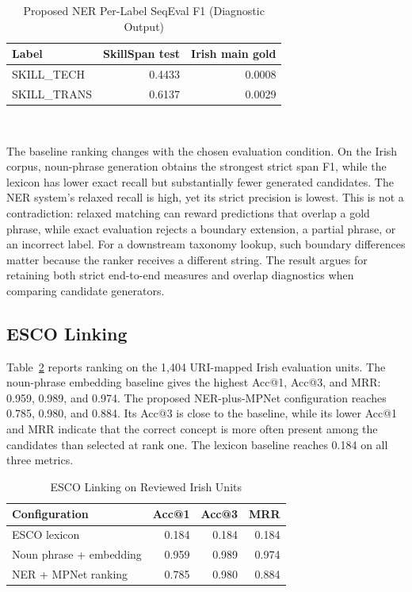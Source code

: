 \documentclass[conference]{IEEEtran}
\begin{document}
\begin{table}[!t]
\caption{Proposed NER Per-Label SeqEval F1 (Diagnostic Output)}
\label{tab:class-f1}
\centering
\small
\begin{tabular}{lrr}
\toprule
Label & SkillSpan test & Irish main gold \\
\midrule
\textsf{SKILL\_TECH} & 0.4433 & 0.0008 \\
\textsf{SKILL\_TRANS} & 0.6137 & 0.0029 \\
\bottomrule
\end{tabular}
\\[1mm]
\par\vspace{1mm}{\footnotesize Source: per-label SeqEval report fields in the final extraction results; these are not class-wise exact-span F1 scores.}
\end{table}

The baseline ranking changes with the chosen evaluation condition. On the Irish corpus, noun-phrase generation obtains the strongest strict span F1, while the lexicon has lower exact recall but substantially fewer generated candidates. The NER system's relaxed recall is high, yet its strict precision is lowest. This is not a contradiction: relaxed matching can reward predictions that overlap a gold phrase, while exact evaluation rejects a boundary extension, a partial phrase, or an incorrect label. For a downstream taxonomy lookup, such boundary differences matter because the ranker receives a different string. The result argues for retaining both strict end-to-end measures and overlap diagnostics when comparing candidate generators.

\subsection{ESCO Linking}
Table~\ref{tab:esco} reports ranking on the 1,404 URI-mapped Irish evaluation units. The noun-phrase embedding baseline gives the highest Acc@1, Acc@3, and MRR: 0.959, 0.989, and 0.974. The proposed NER-plus-MPNet configuration reaches 0.785, 0.980, and 0.884. Its Acc@3 is close to the baseline, while its lower Acc@1 and MRR indicate that the correct concept is more often present among the candidates than selected at rank one. The lexicon baseline reaches 0.184 on all three metrics.

\begin{table}[!t]
\caption{ESCO Linking on Reviewed Irish Units}
\label{tab:esco}
\centering
\small
\begin{tabular}{lrrr}
\toprule
Configuration & Acc@1 & Acc@3 & MRR \\
\midrule
ESCO lexicon & 0.184 & 0.184 & 0.184 \\
Noun phrase + embedding & 0.959 & 0.989 & 0.974 \\
NER + MPNet ranking & 0.785 & 0.980 & 0.884 \\
\bottomrule
\end{tabular}
\\[1mm]
\par{}
\end{table}
\end{document}
